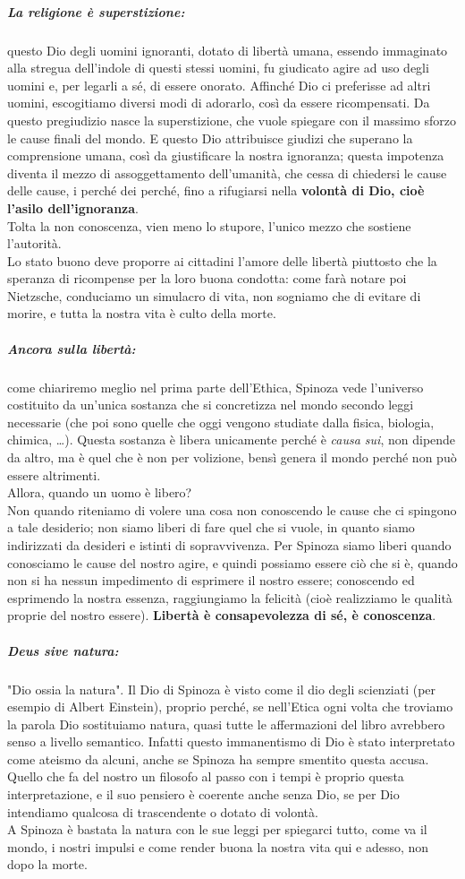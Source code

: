 \subparagraph{La religione è superstizione:}questo Dio degli uomini ignoranti, dotato di libertà umana, essendo immaginato alla stregua dell'indole di questi stessi uomini, fu giudicato agire ad uso degli uomini e, per legarli a sé, di essere onorato. Affinché Dio ci preferisse ad altri uomini, escogitiamo diversi modi di adorarlo, così da essere ricompensati. Da questo pregiudizio nasce la superstizione, che vuole spiegare con il massimo sforzo le cause finali del mondo. E questo Dio attribuisce giudizi che superano la comprensione umana, così da giustificare la nostra ignoranza; questa impotenza diventa il mezzo di assoggettamento dell'umanità, che cessa di chiedersi le cause delle cause, i perché dei perché, fino a rifugiarsi nella  \textbf{volontà di Dio, cioè l'asilo dell'ignoranza}.\\
Tolta la non conoscenza, vien meno lo stupore, l'unico mezzo che sostiene l'autorità.\\
Lo stato buono deve proporre ai cittadini l'amore delle libertà piuttosto che la speranza di ricompense per la loro buona condotta: come farà notare poi Nietzsche, conduciamo un simulacro di vita, non sogniamo che di evitare di morire, e tutta la nostra vita è culto della morte.
\subparagraph{Ancora sulla libertà:}come chiariremo meglio nel prima parte dell'Ethica, Spinoza vede l'universo costituito da un'unica sostanza che si concretizza nel mondo secondo leggi necessarie (che poi sono quelle che oggi vengono studiate dalla fisica, biologia, chimica, \dots). Questa sostanza è libera unicamente perché è \textit{causa sui}, non dipende da altro, ma è quel che è non per volizione, bensì genera il mondo perché non può essere altrimenti.\\
Allora, quando un uomo è libero?\\
Non quando riteniamo di volere una cosa non conoscendo le cause che ci spingono a tale desiderio; non siamo liberi di fare quel che si vuole, in quanto siamo indirizzati da desideri e istinti di sopravvivenza. Per Spinoza siamo liberi quando conosciamo le cause del nostro agire, e quindi possiamo essere ciò che si è, quando non si ha nessun impedimento di esprimere il nostro essere; conoscendo ed esprimendo la nostra essenza, raggiungiamo la felicità (cioè realizziamo le qualità proprie del nostro essere). \textbf{Libertà è consapevolezza di sé, è conoscenza}.
\subparagraph{Deus sive natura:}"Dio ossia la natura". Il Dio di Spinoza è visto come il dio degli scienziati (per esempio di Albert Einstein), proprio perché, se nell'Etica ogni volta che troviamo la parola Dio sostituiamo natura, quasi tutte le affermazioni del libro avrebbero senso a livello semantico. Infatti questo immanentismo di Dio è stato interpretato come ateismo da alcuni, anche se Spinoza ha sempre smentito questa accusa. Quello che fa del nostro un filosofo al passo con i tempi è proprio questa interpretazione, e il suo pensiero è coerente anche senza Dio, se per Dio intendiamo qualcosa di trascendente o dotato di volontà.\\
A Spinoza è bastata la natura con le sue leggi per spiegarci tutto, come va il mondo, i nostri impulsi e come render buona la nostra vita qui e adesso, non dopo la morte.
\newpage